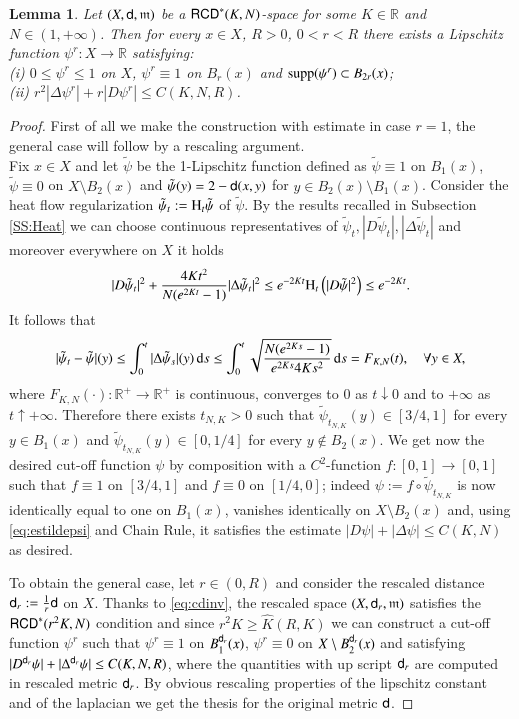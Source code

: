 \documentclass[11pt,reqno]{amsart}
\newcommand{\supp}{\mathop{\rm supp}\nolimits}
\newcommand{\mm}{\mathfrak m}
\newcommand{\sfd}{{\sf d}}
\renewcommand{\H}{{\rm H}}
\renewcommand{\d}{{\rm{d}}}
\newcommand{\R}{\mathbb{R}}
\newcommand{\RCD}{{\sf RCD}}
\newtheorem{lemma}[theorem]{Lemma}
\theoremstyle{definition}
\theoremstyle{remark}
\theoremstyle{remark}
\theoremstyle{remark}
\theoremstyle{remark}
\theoremstyle{remark}
\theoremstyle{remark}
\theoremstyle{remark}
\begin{document}
\begin{lemma}\label{lem:cutoff}
Let $(X,\sfd,\mm)$ be a $\RCD^*(K,N)$-space for some $K \in \R$ and $N\in (1,+\infty)$. Then for every $x\in X$, $R>0$, $0<r<R$  there exists a Lipschitz function $\psi^r:X \to \R$ satisfying:
\\(i) $0\leq \psi^r \leq 1$ on $X$, $\psi^r\equiv 1$ on $B_r(x)$ and $\supp (\psi^r) \subset B_{2r}(x)$;
\\(ii) $r^2|\Delta \psi^r|+r |D \psi^r| \leq C(K,N,R)$. 
\end{lemma}

\begin{proof}
First of all we make the construction with estimate in case $r=1$, the general case will follow by a rescaling argument. 
\\Fix $x\in X$ and let $\tilde{\psi}$ be the 1-Lipschitz function defined as $\tilde{\psi}\equiv 1$ on $B_1(x)$, $\tilde{\psi}\equiv 0$ on $X\setminus B_2(x)$ and $\tilde{\psi}(y)=2-\sfd(x,y)$  for $y \in B_2(x)\setminus B_1(x)$. Consider the heat flow regularization $\tilde{\psi}_t:=\H_t\tilde{\psi}$ of $\tilde{\psi}$. By the results recalled in Subsection \ref{SS:Heat} we can choose continuous representatives of $\tilde{\psi}_t, |D\tilde{\psi}_t|, |\Delta \tilde{\psi}_t|$ and moreover everywhere on $X$ it holds
\begin{equation}\label{eq:estildepsi}
|D \tilde{\psi}_t|^2+\frac{4Kt^2}{N(e^{2Kt}-1)} |\Delta \tilde{\psi}_t|^2 \leq e^{-2Kt} \H_t\left( |D \tilde{\psi}|^2 \right) \leq e^{-2Kt}.
\end{equation}
It follows that
$$|\tilde{\psi}_t-\tilde{\psi}|(y)\leq \int_0^t |\Delta \tilde{\psi}_s|(y) \, \d s \leq \int_0^t \sqrt{\frac{N(e^{2Ks}-1)}{e^{2Ks} 4Ks^2}} \, \d s = F_{K,N}(t), \quad \forall y \in X,$$
where $F_{K,N}(\cdot):\R^+\to \R^+$ is continuous, converges to $0$ as $t\downarrow 0$ and to $+\infty$ as $t\uparrow +\infty$.  Therefore there exists $t_{N,K}>0$ such that $\tilde{\psi}_{t_{N,K}}(y) \in [3/4,1] $ for every $y \in B_1(x)$ and $\tilde{\psi}_{t_{N,K}}(y) \in [0,1/4]$ for every $y \notin B_2(x)$. We get now the desired cut-off function $\psi$ by composition with a $C^2$-function $f:[0,1]\to [0,1]$ such that $f\equiv 1$ on $[3/4,1]$ and $f\equiv 0$ on $[1/4,0]$; indeed  $\psi:=f \circ \tilde{\psi}_{t_{N,K}}$ is now identically equal to one on $B_1(x)$, vanishes identically on $X\setminus B_2(x)$ and, using \eqref{eq:estildepsi} and Chain Rule, it satisfies the estimate $|D\psi|+|\Delta \psi| \leq C(K,N)$ as desired.

To obtain the general case, let $r\in (0,R)$ and consider the rescaled distance $\sfd_r:=\frac{1}{r}\sfd$ on $X$. Thanks to \eqref{eq:cdinv},  the rescaled space $(X,\sfd_r,\mm)$ satisfies the $\RCD^*(r^2 K, N)$ condition and since $r^2 K\geq \hat{K}(R,K)$ we can construct a cut-off function $\psi^r$ such that $\psi^r\equiv 1$ on $B^{\sfd_r}_1(x)$,  $\psi^r\equiv 0$ on $X \setminus B^{\sfd_r}_2(x)$ and satisfying  $|D^{{\sfd_r}}\psi|+|\Delta^{\sfd_r} \psi| \leq C(K,N,R)$, where the quantities with up script  ${\sfd_r}$ are computed in rescaled metric ${\sfd_r}$. By obvious rescaling properties of the lipschitz constant and of the laplacian we get the thesis for the original metric $\sfd$.     
\end{proof}
 
\end{document}
